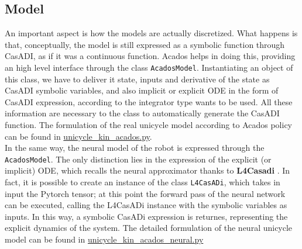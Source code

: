 \subsection{Model}\label{AcadosModel} An important aspect is how the models
are actually discretized. What happens is that, conceptually, the model is
still expressed as a symbolic function through CasADI, as if it was a
continuous function. Acados helps in doing this, providing an high level
interface through the class \texttt{AcadosModel}. Instantiating an object
of this class, we have to deliver it state, inputs and derivative of the
state as CasADI symbolic variables, and also implicit or explicit ODE in
the form of CasADI expression, according to the integrator type wants to be
used. All these information are necessary to the class to automatically
generate the CasADI function. The formulation of the real unicycle model
according to Acados policy can be found in
\href{https://github.com/neverorfrog/simple_neural_mpc/blob/mlp-tests/src/simple_neural_mpc/models/unicycle_kin/unicycle_kin_acados.py}{unicycle\_kin\_acados.py}.\\
In the same way, the neural model of the robot is expressed through the
\texttt{AcadosModel}. The only distinction lies in the expression of the
explicit (or implicit) ODE, which recalls the neural approximator thanks to
\textbf{L4Casadi} \cite{l4casadi}. In fact, it is possible to create an
instance of the class \texttt{L4CasADi}, which takes in input the Pytorch
tensor; at this point the forward pass of the neural network can be
executed, calling the L4CasADi instance with the symbolic variables as
inputs. In this way, a symbolic CasADi expression is returnes, representing
the explicit dynamics of the system. The detailed formulation of the neural
unicycle model can be found in 
\href{https://github.com/neverorfrog/simple_neural_mpc/blob/mlp-tests/src/simple_neural_mpc/models/unicycle_kin/unicycle_kin_acados_neural.py}{unicycle\_kin\_acados\_neural.py}  

